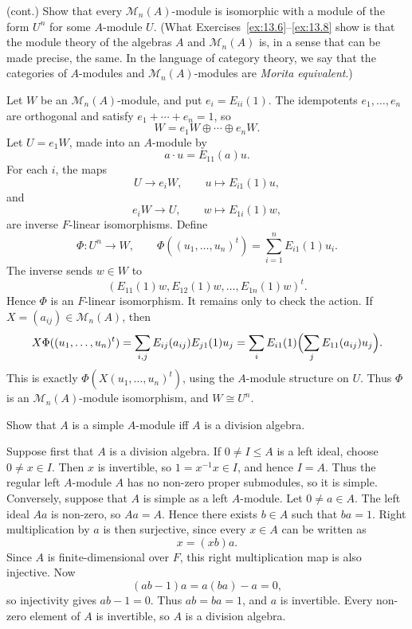 \documentclass[../Odyssey_Project.tex]{subfiles}
\begin{document}
\begin{exercise}
\label{ex:13.8}
(cont.) Show that every $\mathcal{M}_n(A)$-module is isomorphic with a module of the form $U^n$ for some $A$-module $U$. (What Exercises~\ref{ex:13.6}--\ref{ex:13.8} show is that the module theory of the algebras $A$ and $\mathcal{M}_n(A)$ is, in a sense that can be made precise, the same. In the language of category theory, we say that the categories of $A$-modules and $\mathcal{M}_n(A)$-modules are \emph{Morita equivalent}.)
\end{exercise}
\begin{solution}
    Let $W$ be an $\mathcal{M}_n(A)$-module, and put $e_i=E_{ii}(1)$. The idempotents $e_1,\ldots,e_n$ are orthogonal and satisfy $e_1+\cdots+e_n=1$, so
    \[
        W=e_1W\oplus\cdots\oplus e_nW.
    \]
    Let $U=e_1W$, made into an $A$-module by
    \[
        a\cdot u=E_{11}(a)u.
    \]
    For each $i$, the maps
    \[
        U\to e_iW,\qquad u\mapsto E_{i1}(1)u,
    \]
    and
    \[
        e_iW\to U,\qquad w\mapsto E_{1i}(1)w,
    \]
    are inverse $F$-linear isomorphisms. Define
    \[
        \Phi \colon U^n\to W,\qquad
        \Phi((u_1,\ldots,u_n)^t)=\sum_{i=1}^n E_{i1}(1)u_i.
    \]
    The inverse sends $w\in W$ to
    \[
        (E_{11}(1)w,E_{12}(1)w,\ldots,E_{1n}(1)w)^t.
    \]
    Hence $\Phi$ is an $F$-linear isomorphism. It remains only to check the action. If $X=(a_{ij})\in\mathcal{M}_n(A)$, then
    \[
        X\Phi((u_1,\ldots,u_n)^t)
        =\sum_{i,j} E_{ij}(a_{ij})E_{j1}(1)u_j
        =\sum_i E_{i1}(1)\Bigl(\sum_j E_{11}(a_{ij})u_j\Bigr).
    \]
    This is exactly $\Phi(X(u_1,\ldots,u_n)^t)$, using the $A$-module structure on $U$. Thus $\Phi$ is an $\mathcal{M}_n(A)$-module isomorphism, and $W\cong U^n$.
\end{solution}

\begin{exercise}
\label{ex:13.9}
Show that $A$ is a simple $A$-module iff $A$ is a division algebra.
\end{exercise}
\begin{solution}
    Suppose first that $A$ is a division algebra. If $0\neq I\leq A$ is a left ideal, choose $0\neq x\in I$. Then $x$ is invertible, so $1=x^{-1}x\in I$, and hence $I=A$. Thus the regular left $A$-module $A$ has no non-zero proper submodules, so it is simple.\\
    Conversely, suppose that $A$ is simple as a left $A$-module. Let $0\neq a\in A$. The left ideal $Aa$ is non-zero, so $Aa=A$. Hence there exists $b\in A$ such that $ba=1$. Right multiplication by $a$ is then surjective, since every $x\in A$ can be written as
    \[
        x=(xb)a.
    \]
    Since $A$ is finite-dimensional over $F$, this right multiplication map is also injective. Now
    \[
        (ab-1)a=a(ba)-a=0,
    \]
    so injectivity gives $ab-1=0$. Thus $ab=ba=1$, and $a$ is invertible. Every non-zero element of $A$ is invertible, so $A$ is a division algebra.
\end{solution}
\end{document}
